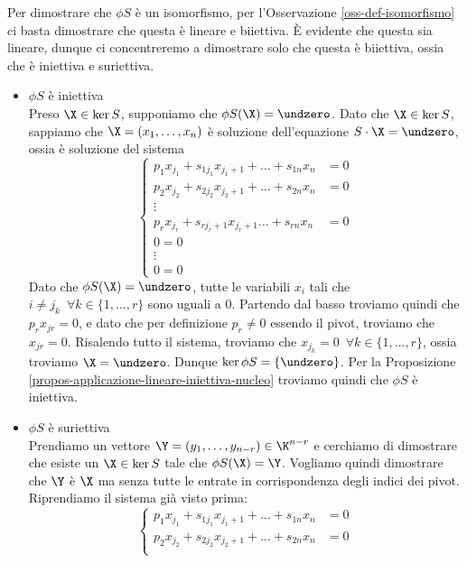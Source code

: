 \documentclass[11pt, a4paper, titlepage, oneside]{scrbook}
\begin{document}
\Dimostrazione \nopagebreak

Per dimostrare che $\phi S$ è un isomorfismo, per l'Osservazione \ref{oss-def-isomorfismo} ci basta dimostrare che questa è lineare e biiettiva. È evidente che questa sia lineare, dunque ci concentreremo a dimostrare solo che questa è biiettiva, ossia che è iniettiva e suriettiva.
\begin{itemize}
    \item $\phi S$ è iniettiva \\
    Preso $\X \in \ker S$, supponiamo che $\phi S (\X) = \undzero$. Dato che $\X \in \ker S$, sappiamo che $\X = (x_1, \ldots, x_n)$ è soluzione dell'equazione $S \cdot \X = \undzero$, ossia è soluzione del sistema
    \[
    \begin{cases}
    p_1 x_{j_1} + s_{1 j_1} x_{j_1+1} + \ldots + s_{1n} x_n &= 0 \\
    p_2 x_{j_2} + s_{2 j_2} x_{j_2 + 1} + \ldots + s_{2n} x_n &= 0 \\
    \vdots \\
    p_r x_{j_r} + s_{r j_r + 1} x_{j_r + 1} \ldots + s_{rn} x_n &= 0 \\
    0 = 0 \\
    \vdots \\
    0 = 0 
    \end{cases}
    \]
    Dato che $\phi S (\X) = \undzero$, tutte le variabili $x_i$ tali che $i \neq j_k \enspace \forall k \in \{1, \ldots, r\}$ sono uguali a $0$. Partendo dal basso troviamo quindi che $p_r x_{jr} = 0$, e dato che per definizione $p_r \neq 0$ essendo il pivot, troviamo che $x_{jr} = 0$. Risalendo tutto il sistema, troviamo che $x_{j_k} = 0 \enspace \forall k \in \{1, \ldots, r\}$, ossia troviamo $\X = \undzero$. Dunque $\ker \phi S = \{\undzero\}$. Per la Proposizione \ref{propos-applicazione-lineare-iniettiva-nucleo} troviamo quindi che $\phi S$ è iniettiva.
    \item $\phi S$ è suriettiva \\
    Prendiamo un vettore $\Y = (y_1, \ldots, y_{n-r}) \in \K^{n-r}$ e cerchiamo di dimostrare che esiste un $\X \in \ker S$ tale che $\phi S (\X) = \Y$. Vogliamo quindi dimostrare che $\Y$ è $\X$ ma senza tutte le entrate in corrispondenza degli indici dei pivot. \\
    Riprendiamo il sistema già visto prima:
    \[
    \begin{cases}
    p_1 x_{j_1} + s_{1 j_1} x_{j_1+1} + \ldots + s_{1n} x_n &= 0 \\
    p_2 x_{j_2} + s_{2 j_2} x_{j_2 + 1} + \ldots + s_{2n} x_n &= 0 \\

\end{cases}\]
\end{itemize}
\end{document}
